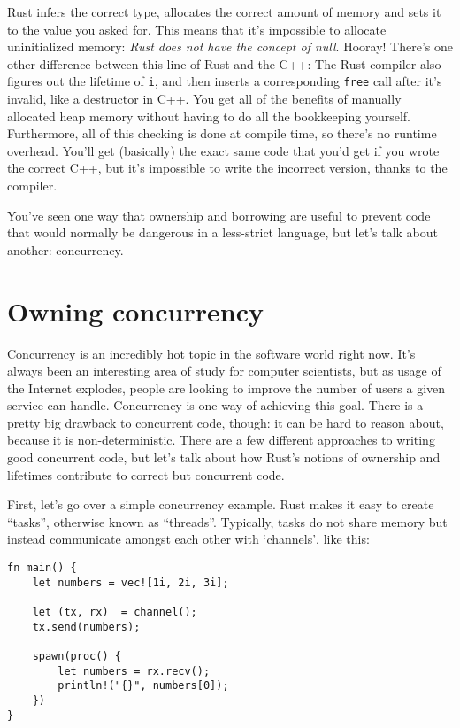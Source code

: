 \documentclass[]{article}
\begin{document}
Rust infers the correct type, allocates the correct amount of memory and
sets it to the value you asked for. This means that it's impossible to
allocate uninitialized memory: \emph{Rust does not have the concept of
null}. Hooray! There's one other difference between this line of Rust
and the C++: The Rust compiler also figures out the lifetime of
\texttt{i}, and then inserts a corresponding \texttt{free} call after
it's invalid, like a destructor in C++. You get all of the benefits of
manually allocated heap memory without having to do all the bookkeeping
yourself. Furthermore, all of this checking is done at compile time, so
there's no runtime overhead. You'll get (basically) the exact same code
that you'd get if you wrote the correct C++, but it's impossible to
write the incorrect version, thanks to the compiler.

You've seen one way that ownership and borrowing are useful to prevent
code that would normally be dangerous in a less-strict language, but
let's talk about another: concurrency.

\section{Owning concurrency}\label{owning-concurrency}

Concurrency is an incredibly hot topic in the software world right now.
It's always been an interesting area of study for computer scientists,
but as usage of the Internet explodes, people are looking to improve the
number of users a given service can handle. Concurrency is one way of
achieving this goal. There is a pretty big drawback to concurrent code,
though: it can be hard to reason about, because it is non-deterministic.
There are a few different approaches to writing good concurrent code,
but let's talk about how Rust's notions of ownership and lifetimes
contribute to correct but concurrent code.

First, let's go over a simple concurrency example. Rust makes it easy to
create ``tasks'', otherwise known as ``threads''. Typically, tasks do
not share memory but instead communicate amongst each other with
`channels', like this:

\begin{verbatim}
fn main() {
    let numbers = vec![1i, 2i, 3i];

    let (tx, rx)  = channel();
    tx.send(numbers);

    spawn(proc() {
        let numbers = rx.recv();
        println!("{}", numbers[0]);
    })
}
\end{verbatim}
\end{document}
